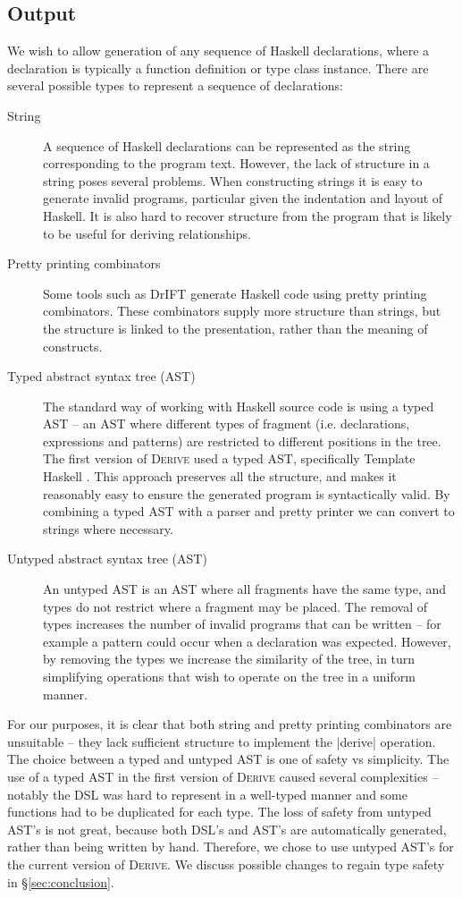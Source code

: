 \documentclass[preprint,draft]{sigplanconf}
\newcommand{\derive}{\textsc{Derive}}
\begin{document}
\subsection{Output}

We wish to allow generation of any sequence of Haskell declarations, where a declaration is typically a function definition or type class instance. There are several possible types to represent a sequence of declarations:

\begin{description}
\item[String] A sequence of Haskell declarations can be represented as the string corresponding to the program text. However, the lack of structure in a string poses several problems. When constructing strings it is easy to generate invalid programs, particular given the indentation and layout of Haskell. It is also hard to recover structure from the program that is likely to be useful for deriving relationships.
\item[Pretty printing combinators] Some tools such as DrIFT \cite{drift} generate Haskell code using pretty printing combinators. These combinators supply more structure than strings, but the structure is linked to the presentation, rather than the meaning of constructs.
\item[Typed abstract syntax tree (AST)] The standard way of working with Haskell source code is using a typed AST -- an AST where different types of fragment (i.e. declarations, expressions and patterns) are restricted to different positions in the tree. The first version of \derive{} used a typed AST, specifically Template Haskell \cite{template_haskell}. This approach preserves all the structure, and makes it reasonably easy to ensure the generated program is syntactically valid. By combining a typed AST with a parser and pretty printer we can convert to strings where necessary.
\item[Untyped abstract syntax tree (AST)] An untyped AST is an AST where all fragments have the same type, and types do not restrict where a fragment may be placed. The removal of types increases the number of invalid programs that can be written -- for example a pattern could occur when a declaration was expected. However, by removing the types we increase the similarity of the tree, in turn simplifying operations that wish to operate on the tree in a uniform manner.
\end{description}

For our purposes, it is clear that both string and pretty printing combinators are unsuitable -- they lack sufficient structure to implement the |derive| operation. The choice between a typed and untyped AST is one of safety vs simplicity. The use of a typed AST in the first version of \derive{} caused several complexities -- notably the DSL was hard to represent in a well-typed manner and some functions had to be duplicated for each type. The loss of safety from untyped AST's is not great, because both DSL's and AST's are automatically generated, rather than being written by hand. Therefore, we chose to use untyped AST's for the current version of \derive{}. We discuss possible changes to regain type safety in \S\ref{sec:conclusion}.
\end{document}

